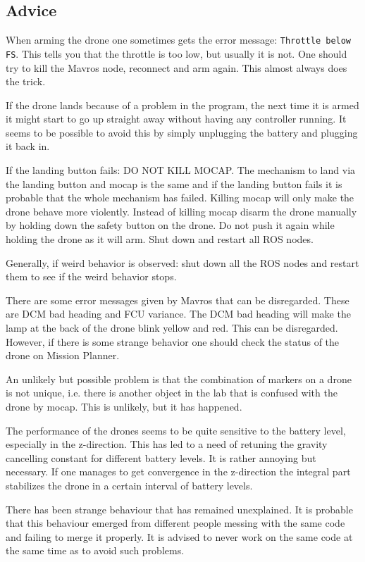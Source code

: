 \documentclass[titlepage,11pt,a4paper]{article}
\begin{document}
\subsection{Advice}
When arming the drone one sometimes gets the error message:
\texttt{Throttle below FS}. This tells you that the throttle is too
low, but usually it is not. One should try to kill the Mavros node,
reconnect and arm again. This almost always does the trick.

If the drone lands because of a problem in the program, the next time
it is armed it might start to go up straight away without having any
controller running. It seems to be possible to avoid this by simply
unplugging the battery and plugging it back in.

If the landing button fails: DO NOT KILL MOCAP. The mechanism to land
via the landing button and mocap is the same and if the landing button
fails it is probable that the whole mechanism has failed. Killing
mocap will only make the drone behave more violently. Instead of
killing mocap disarm the drone manually by holding down the safety
button on the drone. Do not push it again while holding the drone as
it will arm. Shut down and restart all ROS nodes.

Generally, if weird behavior is observed: shut down all the ROS nodes
and restart them to see if the weird behavior stops.

There are some error messages given by Mavros that can be
disregarded. These are DCM bad heading and FCU variance. The DCM bad
heading will make the lamp at the back of the drone blink yellow and
red. This can be disregarded. However, if there is some strange
behavior one should check the status of the drone on Mission Planner.

An unlikely but possible problem is that the combination of markers on
a drone is not unique, i.e. there is another object in the lab that is
confused with the drone by mocap. This is unlikely, but it has
happened.

The performance of the drones seems to be quite sensitive to the
battery level, especially in the z-direction. This has led to a need
of retuning the gravity cancelling constant for different battery
levels. It is rather annoying but necessary. If one manages to get
convergence in the z-direction the integral part stabilizes the drone
in a certain interval of battery levels.

There has been strange behaviour that has remained unexplained. It is
probable that this behaviour emerged from different people messing
with the same code and failing to merge it properly. It is advised to
never work on the same code at the same time as to avoid such
problems.
\end{document}
